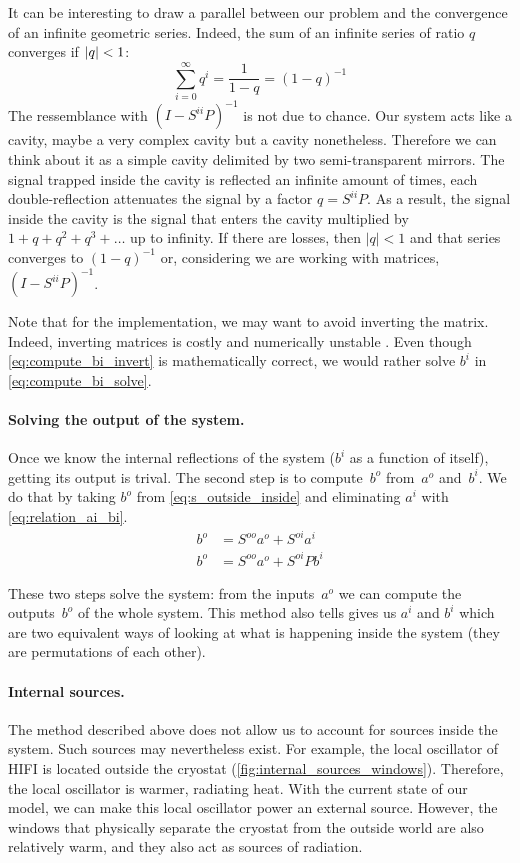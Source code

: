 It can be interesting to draw a parallel between our problem and the convergence of an infinite geometric series.
Indeed, the sum of an infinite series of ratio $q$ converges if $\left| q \right| < 1$:
\begin{equation}
    \sum_{i=0}^\infty q^i = \frac{1}{1-q} = (1-q)^{-1}
\end{equation}
The ressemblance with $(I - S^{ii}P)^{-1}$ is not due to chance.
Our system acts like a cavity, maybe a very complex cavity but a cavity nonetheless.
Therefore we can think about it as a simple cavity delimited by two semi-transparent mirrors.
The signal trapped inside the cavity is reflected an infinite amount of times, each double-reflection attenuates the signal by a factor $q=S^{ii}P$.
As a result, the signal inside the cavity is the signal that enters the cavity multiplied by $1+q+q^2+q^3+\dots$ up to infinity.
If there are losses, then $|q|<1$ and that series converges to $(1-q)^{-1}$ or, considering we are working with matrices, $(I - S^{ii}P)^{-1}$.

Note that for the implementation, we may want to avoid inverting the matrix.
Indeed, inverting matrices is costly and numerically unstable .
Even though \cref{eq:compute_bi_invert} is mathematically correct, we would rather solve $b^i$ in \cref{eq:compute_bi_solve}.

\paragraph{Solving the output of the system.}
Once we know the internal reflections of the system ($b^i$ as a function of itself), getting its output is trival.
The second step is to compute~$b^o$ from~$a^o$ and~$b^i$.
We do that by taking $b^o$ from \cref{eq:s_outside_inside} and eliminating $a^i$ with \cref{eq:relation_ai_bi}.
\begin{align}
    b^o &= S^{oo}a^o + S^{oi}a^i \\
    b^o &= S^{oo}a^o + S^{oi}Pb^i \label{eq:compute_bo}
\end{align}

These two steps solve the system: from the inputs~$a^o$ we can compute the outputs~$b^o$ of the whole system.
This method also tells gives us $a^i$ and $b^i$ which are two equivalent ways of looking at what is happening inside the system (they are permutations of each other).



\paragraph{Internal sources.}
The method described above does not allow us to account for sources inside the system.
Such sources may nevertheless exist.
For example, the local oscillator of HIFI is located outside the cryostat (\cref{fig:internal_sources_windows}).
Therefore, the local oscillator is warmer, radiating heat.
With the current state of our model, we can make this local oscillator power an external source.
However, the windows that physically separate the cryostat from the outside world are also relatively warm, and they also act as sources of radiation.

